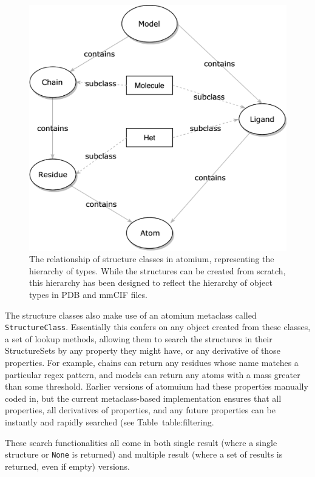 \begin{figure}
\centering
\includegraphics[width=1.0\textwidth]{Figures/atomium-classes.eps}
\caption[atomium classes.]{\label{fig:atomium-classes} The relationship of structure classes in atomium, representing the hierarchy of types. While the structures can be created from scratch, this hierarchy has been designed to reflect the hierarchy of object types in PDB and mmCIF files.}
\end{figure}

The structure classes also make use of an atomium metaclass called \texttt{StructureClass}. Essentially this confers on any object created from these classes, a set of lookup methods, allowing them to search the structures in their StructureSets by any property they might have, or any derivative of those properties. For example, chains can return any residues whose name matches a particular regex pattern, and models can return any atoms with a mass greater than some threshold. Earlier versions of atomuium had these properties manually coded in, but the current metaclass-based implementation ensures that all properties, all derivatives of properties, and any future properties can be instantly and rapidly searched (see Table~{table:filtering}.

These search functionalities all come in both single result (where a single structure or \texttt{None} is returned) and multiple result (where a set of results is returned, even if empty) versions.

